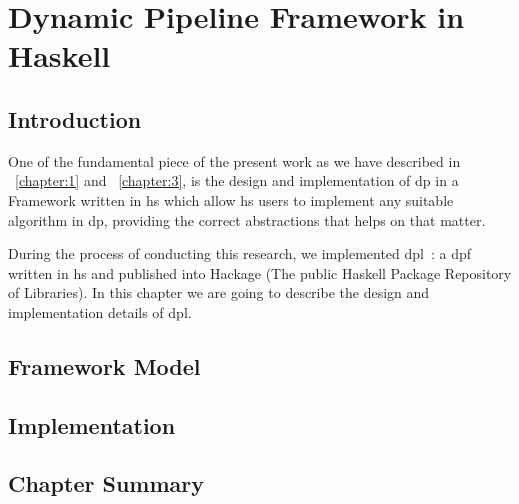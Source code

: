 \chapter{Dynamic Pipeline Framework in Haskell}
\section{Introduction}
One of the fundamental piece of the present work as we have described in ~\autoref{chapter:1} and ~\autoref{chapter:3},
is the design and implementation of \acrshort{dp} in a Framework written in \acrshort{hs} which allow \acrshort{hs} users
to implement any suitable algorithm in \acrshort{dp}, providing the correct abstractions that helps on that matter.

During the process of conducting this research, we implemented \acrfull{dpl}~\cite{dynamic-pipeline}: 
a \acrfull{dpf} written in \acrshort{hs} and published into Hackage (The public Haskell Package Repository of Libraries).
In this chapter we are going to describe the design and implementation details of \acrshort{dpl}.

\section{Framework Model}
\section{Implementation}
\section{Chapter Summary}

